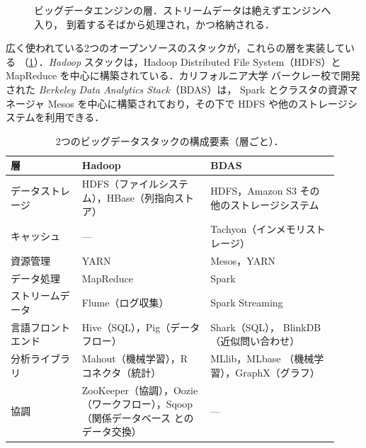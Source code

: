 \documentclass[../main.tex]{subfiles}
\begin{document}
\begin{figure}[htbp]
  \centering
  
  \caption{ビッグデータエンジンの層．ストリームデータは絶えずエンジンへ入り，
    到着するそばから処理され，かつ格納される．}
  \label{fig:l16-bigdata}
\end{figure}

広く使われている2つのオープンソースのスタックが，これらの層を実装している
（\cref{tab:l16-stacks}）．\emph{Hadoop} スタックは，Hadoop Distributed File
System（HDFS）と MapReduce を中心に構築されている．カリフォルニア大学
バークレー校で開発された \emph{Berkeley Data Analytics Stack}（BDAS）は，
Spark とクラスタの資源マネージャ Mesos を中心に構築されており，その下で
HDFS や他のストレージシステムを利用できる．

\begin{table}[htbp]
  \centering
  \caption{2つのビッグデータスタックの構成要素（層ごと）．}
  \label{tab:l16-stacks}
  \small
  \begin{tabular}{@{}>{\raggedright\arraybackslash}p{0.2\linewidth}>{\raggedright\arraybackslash}p{0.36\linewidth}>{\raggedright\arraybackslash}p{0.36\linewidth}@{}}
    \toprule
    層 & Hadoop & BDAS \\
    \midrule
    データストレージ & HDFS（ファイルシステム），HBase（列指向ストア） &
      HDFS，Amazon S3 その他のストレージシステム \\
    キャッシュ & --- & Tachyon（インメモリストレージ） \\
    資源管理 & YARN & Mesos，YARN \\
    データ処理 & MapReduce & Spark \\
    ストリームデータ & Flume（ログ収集） & Spark Streaming \\
    言語フロントエンド & Hive（SQL），Pig（データフロー） & Shark（SQL），
      BlinkDB（近似問い合わせ） \\
    分析ライブラリ & Mahout（機械学習），R コネクタ（統計） & MLlib，MLbase
      （機械学習），GraphX（グラフ） \\
    協調 & ZooKeeper（協調），Oozie（ワークフロー），Sqoop（関係データベース
      とのデータ交換） & --- \\
    \bottomrule
  \end{tabular}
\end{table}
\end{document}
